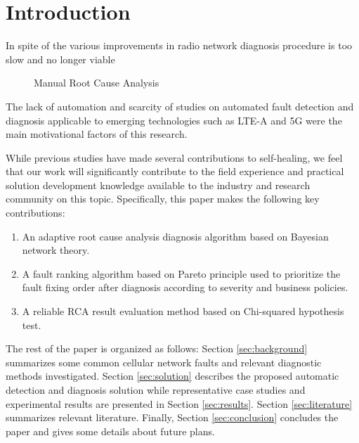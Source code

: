 \documentclass[conference]{IEEEtran}
\begin{document}
\section{Introduction}
In spite of the various improvements in radio network diagnosis procedure is too slow and no longer viable  
 \begin{figure}[!h]
       	        \caption{Manual Root Cause Analysis}
       	        \label{fig:manua_rca}
       	        \end{figure} 


The lack of automation and scarcity of studies on automated fault detection and diagnosis applicable to emerging technologies such as LTE-A and 5G were the main motivational factors of this research. 

While  previous studies have made several contributions to self-healing, we feel that our work will significantly contribute to the field experience and practical solution development knowledge available to the industry and research community on this topic. 
Specifically, this paper makes the following key contributions:
\begin{enumerate}
\item An adaptive root cause analysis  diagnosis algorithm based on Bayesian network theory.
\item A fault ranking algorithm based on Pareto principle used to prioritize the fault fixing order after diagnosis according to severity and business policies. 
\item A reliable RCA result evaluation method based on Chi-squared hypothesis test. 
\end{enumerate}
The rest of the paper is organized as follows: Section  \ref{sec:background} summarizes some common cellular network faults and relevant diagnostic methods investigated. Section \ref{sec:solution} describes  
 the proposed automatic detection and diagnosis solution  while  representative case studies and experimental results are presented in Section \ref{sec:results}. Section \ref{sec:literature} summarizes relevant literature. Finally, Section \ref{sec:conclusion} concludes the paper and gives some details about future plans.
\end{document}
